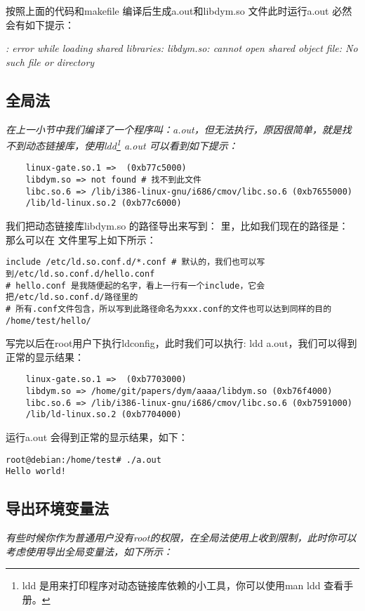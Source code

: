 \documentclass{article}
\begin{document}
按照上面的代码和makefile 编译后生成a.out和libdym.so 文件此时运行a.out 必然会有如下提示：

\textit{
: error while loading shared libraries: libdym.so: cannot open shared object file: 
No such file or directory
}

\subsection{全局法}
\textit{
在上一小节中我们编译了一个程序叫：a.out，但无法执行，原因很简单，就是找不到动态链接库，使用ldd\footnote{
ldd 是用来打印程序对动态链接库依赖的小工具，你可以使用man ldd 查看手册。
} a.out
可以看到如下提示：
}

\begin{verbatim}
	linux-gate.so.1 =>  (0xb77c5000)
	libdym.so => not found # 找不到此文件
	libc.so.6 => /lib/i386-linux-gnu/i686/cmov/libc.so.6 (0xb7655000)
	/lib/ld-linux.so.2 (0xb77c6000)
\end{verbatim}

我们把动态链接库libdym.so 的路径导出来写到： 里，比如我们现在的路径是：
 那么可以在 文件里写上如下所示：
\begin{verbatim}
include /etc/ld.so.conf.d/*.conf # 默认的，我们也可以写到/etc/ld.so.conf.d/hello.conf
# hello.conf 是我随便起的名字，看上一行有一个include，它会把/etc/ld.so.conf.d/路径里的
# 所有.conf文件包含，所以写到此路径命名为xxx.conf的文件也可以达到同样的目的
/home/test/hello/
\end{verbatim}

写完以后在root用户下执行ldconfig，此时我们可以执行: ldd a.out，我们可以得到正常的显示结果：
\begin{verbatim}
	linux-gate.so.1 =>  (0xb7703000)
	libdym.so => /home/git/papers/dym/aaaa/libdym.so (0xb76f4000)
	libc.so.6 => /lib/i386-linux-gnu/i686/cmov/libc.so.6 (0xb7591000)
	/lib/ld-linux.so.2 (0xb7704000)
\end{verbatim}

运行a.out 会得到正常的显示结果，如下：

\begin{verbatim}
root@debian:/home/test# ./a.out 
Hello world!
\end{verbatim}

\subsection{导出环境变量法}
\textit{
有些时候你作为普通用户没有root的权限，在全局法使用上收到限制，此时你可以考虑使用导出全局变量法，如下所示：
}
\end{document}

